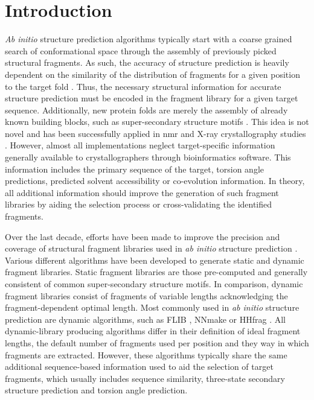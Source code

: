 \section{Introduction}
\textit{Ab initio} structure prediction algorithms typically start with a coarse grained search of conformational space through the assembly of previously picked structural fragments. As such, the accuracy of structure prediction is heavily dependent on the similarity of the distribution of fragments for a given position to the target fold \cite{Gront2011-ik}. Thus, the necessary structural information for accurate structure prediction must be encoded in the fragment library for a given target sequence. Additionally, new protein folds are merely the assembly of already known building blocks, such as super-secondary structure motifs \cite{Fernandez-Fuentes2010-iu}. This idea is not novel and has been successfully applied in \gls{nmr} and X-ray crystallography studies \cite{Jones1986-kh,Delaglio2000-pu,Kontaxis2005-bz,Sammito2013-tt}. However, almost all implementations neglect target-specific information generally available to crystallographers through bioinformatics software. This information includes the primary sequence of the target, torsion angle predictions, predicted solvent accessibility or co-evolution information. In theory, all additional information should improve the generation of such fragment libraries by aiding the selection process or cross-validating the identified fragments.

Over the last decade, efforts have been made to improve the precision and coverage of structural fragment libraries used in \textit{ab initio} structure prediction \cite{Shen2013-ag,Li2008-fu,Kalev2011-te,Bhattacharya2016-bp,Wang2017-ox,De_Oliveira2015-ba,Gront2011-ik}. Various different algorithms have been developed to generate static and dynamic fragment libraries. Static fragment libraries are those pre-computed and generally consistent of common super-secondary structure motifs. In comparison, dynamic fragment libraries consist of fragments of variable lengths acknowledging the fragment-dependent optimal length. Most commonly used in \textit{ab initio} structure prediction are dynamic algorithms, such as FLIB \cite{De_Oliveira2015-ba}, NNmake \cite{Gront2011-ik} or HHfrag \cite{Kalev2011-te}. All dynamic-library producing algorithms differ in their definition of ideal fragment lengths, the default number of fragments used per position and they way in which fragments are extracted. However, these algorithms typically share the same additional sequence-based information used to aid the selection of target fragments, which usually includes sequence similarity, three-state secondary structure prediction and torsion angle prediction.

